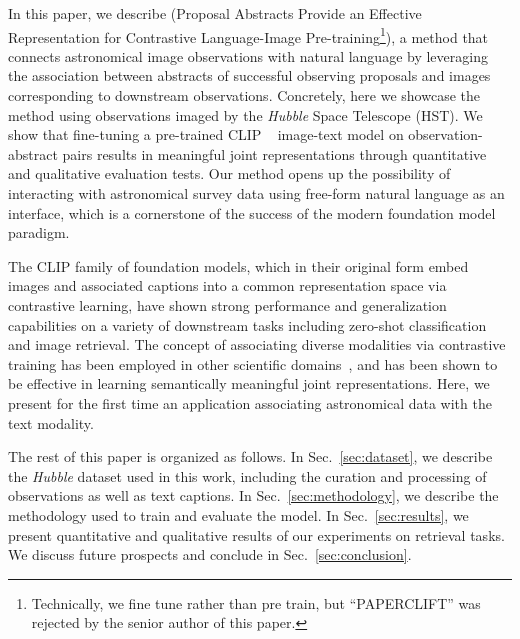 \documentclass[10pt]{article} %
\newcommand{\hubble}{\emph{Hubble}\xspace}
\newcommand{\SM}[1]{\textcolor{blue}{[SM: #1]}}
\begin{document}
In this paper, we describe  (Proposal Abstracts Provide an Effective Representation for Contrastive Language-Image Pre-training\footnote{Technically, we fine tune rather than pre train, but ``PAPERCLIFT'' was rejected by the senior author of this paper.}), a method that connects astronomical image observations with natural language by leveraging the association between abstracts of successful observing proposals and images corresponding to downstream observations. 
%
Concretely, here we showcase the method using observations imaged by the \hubble Space Telescope (HST).
%
We show that fine-tuning a pre-trained CLIP ~\citep[Contrastive Language-Image Pre-training; ][]{radford2021learning} image-text model on observation-abstract pairs results in meaningful joint representations through quantitative and qualitative evaluation tests.
%
Our method opens up the possibility of interacting with astronomical survey data using free-form natural language as an interface, which is a cornerstone of the success of the modern foundation model paradigm.
%

The CLIP family of foundation models, which in their original form embed images and associated captions into a common representation space via contrastive learning, have shown strong performance and generalization capabilities on a variety of downstream tasks including zero-shot classification and image retrieval.
%
The concept of associating diverse modalities via contrastive training has been employed in other scientific domains~\citep[e.g.,][]{liu2023text,Sanchez-Fernandez2022.11.17.516915,lanusse2023astroclip,cepeda2023geoclip}, and has been shown to be effective in learning semantically meaningful joint representations. Here, we present for the first time an application associating astronomical data with the text modality.


The rest of this paper is organized as follows.
%
In Sec.~\ref{sec:dataset}, we describe the \hubble dataset used in this work, including the curation and processing of observations as well as text captions.
%
In Sec.~\ref{sec:methodology}, we describe the methodology used to train and evaluate the model.
%
In Sec.~\ref{sec:results}, we present quantitative and qualitative results of our experiments on retrieval tasks.
%
We discuss future prospects and conclude in Sec.~\ref{sec:conclusion}.
\end{document}
